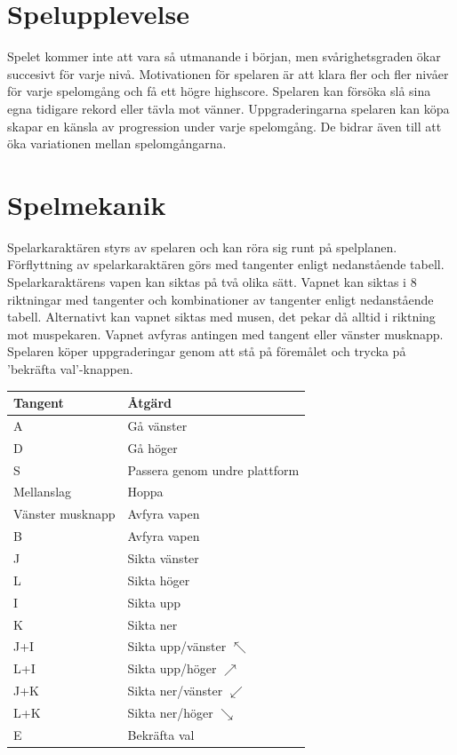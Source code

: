 \documentclass{TDP005mall}
\begin{document}
\section{Spelupplevelse}
Spelet kommer inte att vara så utmanande i början, men svårighetsgraden ökar succesivt för varje nivå. Motivationen för spelaren är att klara fler och fler nivåer för varje spelomgång och få ett högre highscore. Spelaren kan försöka slå sina egna tidigare rekord eller tävla mot vänner. 
Uppgraderingarna spelaren kan köpa skapar en känsla av progression under varje spelomgång. De bidrar även till att öka variationen mellan spelomgångarna. 

\newpage

\section{Spelmekanik}
Spelarkaraktären styrs av spelaren och kan röra sig runt på spelplanen. Förflyttning av spelarkaraktären görs med tangenter enligt nedanstående tabell. Spelarkaraktärens vapen kan siktas på två olika sätt. Vapnet kan siktas i 8 riktningar med tangenter och kombinationer av tangenter enligt nedanstående tabell. Alternativt kan vapnet siktas med musen, det pekar då alltid i riktning mot muspekaren. Vapnet avfyras antingen med tangent eller vänster musknapp. Spelaren köper uppgraderingar genom att stå på föremålet och trycka på 'bekräfta val'-knappen. 

\begin{table}[!h]
\begin{tabularx}{0.6\columnwidth}{|l|X|}
\hline
Tangent & Åtgärd \\\hline
A & Gå vänster \\\hline
D & Gå höger \\\hline
S & Passera genom undre plattform \\\hline
Mellanslag & Hoppa \\\hline
Vänster musknapp & Avfyra vapen \\\hline
B & Avfyra vapen \\\hline
J & Sikta vänster \\\hline
L & Sikta höger \\\hline
I & Sikta upp \\\hline
K & Sikta ner \\\hline
J+I & Sikta upp/vänster $\nwarrow$ \\\hline
L+I & Sikta upp/höger $\nearrow$ \\\hline
J+K & Sikta ner/vänster $\swarrow$ \\\hline
L+K & Sikta ner/höger $\searrow$ \\\hline
E & Bekräfta val \\\hline
\end{tabularx}
\end{table}
\end{document}
